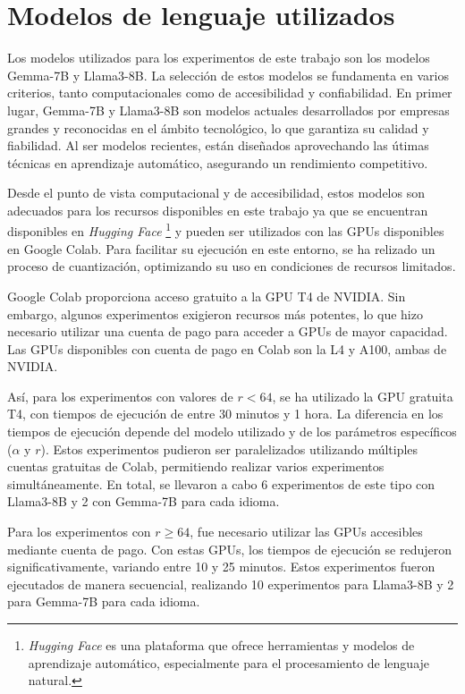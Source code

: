 \documentclass[11pt,spanish,listoffigures,listoftables]{tfgetsinf}
\begin{document}
\section{Modelos de lenguaje utilizados}

Los modelos utilizados para los experimentos de este trabajo son los modelos Gemma-7B y Llama3-8B. La selección de estos modelos se fundamenta en varios criterios, tanto computacionales como de accesibilidad y confiabilidad. En primer lugar, Gemma-7B y Llama3-8B son modelos actuales desarrollados por empresas grandes y reconocidas en el ámbito tecnológico, lo que garantiza su calidad y fiabilidad. Al ser modelos recientes, están diseñados aprovechando las útimas técnicas en aprendizaje automático, asegurando un rendimiento competitivo.

Desde el punto de vista computacional y de accesibilidad, estos modelos son adecuados para los recursos disponibles en este trabajo ya que se encuentran disponibles en \textit{Hugging Face} \footnote{\textit{Hugging Face} es una plataforma que ofrece herramientas y modelos de aprendizaje automático, especialmente para el procesamiento de lenguaje natural.} y pueden ser utilizados con las GPUs disponibles en Google Colab. Para facilitar su ejecución en este entorno, se ha relizado un proceso de cuantización, optimizando su uso en condiciones de recursos limitados.

Google Colab proporciona acceso gratuito a la GPU T4 de NVIDIA. Sin embargo, algunos experimentos exigieron recursos más potentes, lo que hizo necesario utilizar una cuenta de pago para acceder a GPUs de mayor capacidad. Las GPUs disponibles con cuenta de pago en Colab son la L4 y A100, ambas de NVIDIA.

Así, para los experimentos con valores de $r < 64$, se ha utilizado la GPU gratuita T4, con tiempos de ejecución de entre 30 minutos y 1 hora. La diferencia en los tiempos de ejecución depende del modelo utilizado y de los parámetros específicos ($\alpha$ y $r$). Estos experimentos pudieron ser paralelizados utilizando múltiples cuentas gratuitas de Colab, permitiendo realizar varios experimentos simultáneamente. En total, se llevaron a cabo 6 experimentos de este tipo con Llama3-8B y 2 con Gemma-7B para cada idioma.

Para los experimentos con $r \ge 64$, fue necesario utilizar las GPUs accesibles mediante cuenta de pago. Con estas GPUs, los tiempos de ejecución se redujeron significativamente, variando entre 10 y 25 minutos. Estos experimentos fueron ejecutados de manera secuencial, realizando 10 experimentos para Llama3-8B y 2 para Gemma-7B para cada idioma.
\end{document}
